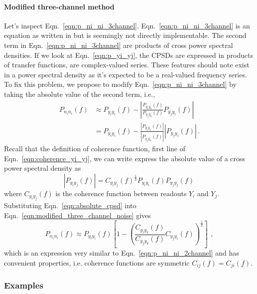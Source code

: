 \paragraph{Modified three-channel method}

Let's inspect Eqn.~\eqref{eqn:p_ni_ni_3channel}.
Eqn.~\eqref{eqn:p_ni_ni_3channel} is an equation as written in \cite{Sleeman2006ThreeChannelCA} but is seemingly not directly implementable.
The second term in Eqn.~\eqref{eqn:p_ni_ni_3channel} are products of cross power spectral densities.
If we look at Eqn.~\eqref{eqn:p_yi_yj}, the CPSDs are expressed in products of transfer functions, are complex-valued series.
These features should note exist in a power spectral density as it's expected to be a real-valued frequency series.
To fix this problem, we propose to modify Eqn.~\ref{eqn:p_ni_ni_3channel} by taking the absolute value of the second term, i.e.,
\begin{equation}
	\begin{split}
	P_{n_in_i}(f) &\approx P_{y_iy_i}(f) - \left\lvert\frac{P_{y_iy_k}(f)}{P_{y_jy_k}(f)}P_{y_jy_i}(f)\right\rvert\\
	&= P_{y_iy_i}(f) - \frac{\left\lvert P_{y_iy_k}(f)\right\rvert}{\left\lvert P_{y_jy_k}(f)\right\rvert}\left\lvert P_{y_jy_i}(f)\right\rvert\,.
	\end{split}
	\label{eqn:modified_three_channel_noise}
\end{equation}
Recall that the definition of coherence function, first line of Eqn.~\eqref{eqn:coherence_yi_yj}, we can write express the absolute value of a cross power spectral density as
\begin{equation}
	\left\lvert P_{y_iy_j}(f)\right\rvert = C_{y_iy_j}(f)^{\frac{1}{2}}P_{y_iy_i}(f)P_{y_jy_j}(f)\,
	\label{eqn:absolute_cpsd}
\end{equation}
where $C_{y_iy_j}(f)$ is the coherence function between readouts $Y_i$ and $Y_j$.
Substituting Eqn.~\eqref{eqn:absolute_cpsd} into Eqn.~\eqref{eqn:modified_three_channel_noise} gives
\begin{equation}
	\boxed{
		P_{n_in_i}(f) \approx 	P_{y_iy_i}(f)\left[1-\left(\frac{C_{y_iy_k}(f)}{C_{y_jy_k}(f)}C_{y_jy_i}(f)\right)^\frac{1}{2}\right]
	}\,\ ,
	\label{eqn:modified_p_ni_ni_3channel}
\end{equation}
which is an expression very similar to Eqn.~\ref{eqn:p_ni_ni_2channel} and has convenient properties, i.e. coherence functions are symmetric $C_{ij}(f) = C_{ji}(f)$.

\subsubsection{Examples}

